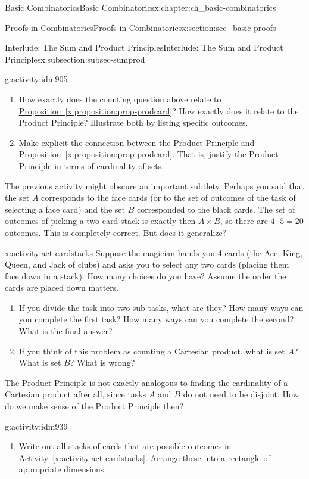 \documentclass[oneside,10pt,]{book}
\numberwithin{equation}{chapter}
\begin{document}
\begin{chapterptx}{Basic Combinatorics}{}{Basic Combinatorics}{}{}{x:chapter:ch_basic-combinatorics}
\begin{sectionptx}{Proofs in Combinatorics}{}{Proofs in Combinatorics}{}{}{x:section:sec_basic-proofs}
\begin{subsectionptx}{Interlude: The Sum and Product Principles}{}{Interlude: The Sum and Product Principles}{}{}{x:subsection:subsec-sumprod}
\begin{activity}{}{g:activity:idm905}
\begin{enumerate}[font=\bfseries,label=(\alph*),ref=\alph*]
\item{}How exactly does the counting question above relate to \hyperref[x:proposition:prop-prodcard]{Proposition~\ref{x:proposition:prop-prodcard}}?  How exactly does it relate to the Product Principle?  Illustrate both by listing specific outcomes.%
\item{}Make explicit the connection between the Product Principle and \hyperref[x:proposition:prop-prodcard]{Proposition~\ref{x:proposition:prop-prodcard}}.  That is, justify the Product Principle in terms of cardinality of sets.%
\end{enumerate}
\end{activity}
The previous activity might obscure an important subtlety.  Perhaps you said that the set \(A\) corresponds to the face cards (or to the set of outcomes of the task of selecting a face card) and the set \(B\) corresponded to the black cards.  The set of outcomes of picking a two card stack is exactly then \(A \times B\), so there are \(4\cdot 5 = 20\) outcomes.  This is completely correct.  But does it generalize?%
\begin{activity}{}{x:activity:act-cardstacks}%
Suppose the magician hands you 4 cards (the Ace, King, Queen, and Jack of clubs) and asks you to select any two cards (placing them face down in a stack).  How many choices do you have?  Assume the order the cards are placed down matters.%
\begin{enumerate}[font=\bfseries,label=(\alph*),ref=\alph*]
\item{}If you divide the task into two sub-tasks, what are they?  How many ways can you complete the first task?  How many ways can you complete the second?  What is the final answer?%
\item{}If you think of this problem as counting a Cartesian product, what is set \(A\)?  What is set \(B\)?  What is wrong?%
\end{enumerate}
\end{activity}
The Product Principle is not exactly analogous to finding the cardinality of a Cartesian product after all, since tasks \(A\) and \(B\) do not need to be disjoint.  How do we make sense of the Product Principle then?%
\begin{activity}{}{g:activity:idm939}%
\begin{enumerate}[font=\bfseries,label=(\alph*),ref=\alph*]
\item{}Write out all stacks of cards that are possible outcomes in \hyperref[x:activity:act-cardstacks]{Activity~\ref{x:activity:act-cardstacks}}.  Arrange these into a rectangle of appropriate dimensions.%

\end{enumerate}
\end{activity}
\end{subsectionptx}
\end{sectionptx}
\end{chapterptx}
\end{document}
